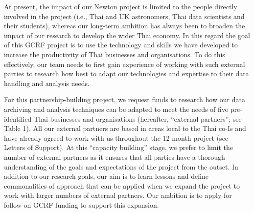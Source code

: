 \documentclass[11pt]{article}
\begin{document}
  \noindent
  At present, the impact of our Newton project is limited to the people directly involved in the project (i.e., Thai and UK astronomers, Thai data scientists and their students), whereas our long-term ambition has always been to broaden the impact of our research to develop the wider Thai economy. In this regard the goal of this GCRF project is to use the technology and skills we have developed to increase the productivity of Thai businesses and organisations. To do this effectively, our team needs to first gain experience of working with such external parties to research how best to adapt our technologies and expertise to their data handling and analysis needs.  
  
  \vspace{2mm}
  \noindent
  For this partnership-building project, we request funds to research how our data archiving and analysis techniques can be adapted to meet the needs of five pre-identified Thai businesses and organisations (hereafter, ``external partners''; see Table 1). All our external partners are based in areas local to the Thai co-Is and have already agreed to work with us throughout the 12-month project (see Letters of Support). At this ``capacity building'' stage, we prefer to limit the number of external partners as it ensures that all parties have a thorough understanding of the goals and expectations of the project from the outset. In addition to our research goals, our aim is to learn lessons and define commonalities of approach that can be applied when we expand the project to work with larger numbers of external partners. Our ambition is to apply for follow-on GCRF funding to support this expansion.
  
\end{document}
